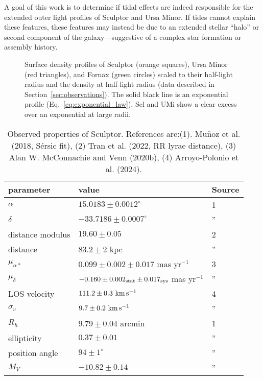 A goal of this work is to determine if tidal effects are indeed
responsible for the extended outer light profiles of Sculptor and Ursa
Minor. If tides cannot explain these features, these features may
instead be due to an extended stellar ``halo'' or second component of
the galaxy---suggestive of a complex star formation or assembly history.

\begin{figure}
\centering
{}
\caption[The extended stellar profiles of Sculptor and Ursa
Minor]{Surface density profiles of Sculptor (orange squares), Ursa Minor
(red triangles), and Fornax (green circles) scaled to their half-light
radius and the density at half-light radius (data described in
Section~\ref{sec:observations}). The solid black line is an exponential
profile (Eq.~\ref{eq:exponential_law}). Scl and UMi show a clear excess
over an exponential at large radii.}\label{fig:scl_umi_vs_fornax}
\end{figure}

\begin{table*}[t]
\centering
\caption[Observed Properties of Sculptor]{Observed properties of Sculptor. References are:(1). Muñoz et al. (2018, Sérsic fit), (2) Tran et al. (2022, RR lyrae distance), (3) Alan W. McConnachie and Venn (2020b), (4) Arroyo-Polonio et al. (2024). }
\label{tbl:scl_obs_props}
\begin{tabular}{lll}
\toprule
parameter & value & Source\\
\midrule
$\alpha$ & $15.0183 \pm 0.0012^\circ$ & 1\\
$\delta$ & $-33.7186 \pm 0.0007^\circ$ & ”\\
distance modulus & $19.60 \pm 0.05$ & 2\\
distance & $83.2 \pm 2$ kpc & ”\\
$\mu_{\alpha*}$ & $0.099 \pm 0.002 \pm 0.017$ mas yr$^{-1}$ & 3\\
$\mu_\delta$ & $-0.160 \pm 0.002_{\rm stat} \pm 0.017_{\rm sys}$ mas yr$^{-1}$ & ”\\
LOS velocity & $111.2 \pm 0.3\ {\rm km\,s^{-1}}$ & 4\\
$\sigma_v$ & $9.7\pm0.2\ {\rm km\,s^{-1}}$ & ”\\
$R_h$ & $9.79 \pm 0.04$ arcmin & 1\\
ellipticity & $0.37 \pm 0.01$ & ”\\
position angle & $94\pm1^\circ$ & ”\\
$M_V$ & $-10.82\pm0.14$ & ”\\
\bottomrule
\end{tabular}
\end{table*}

